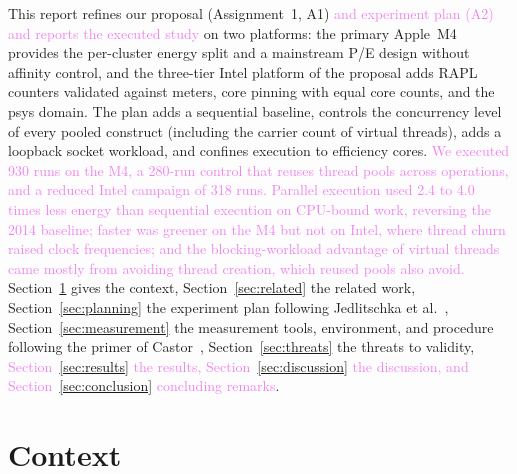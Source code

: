 \documentclass[sigconf,nonacm]{acmart}
\newcommand{\upd}[1]{\textcolor{violet}{#1}}
\begin{document}
This report refines our proposal (Assignment~1, A1) \upd{and experiment plan (A2) and reports the executed study} on two platforms: the primary Apple~M4 provides the per-cluster energy split and a mainstream P/E design without affinity control, and the three-tier Intel platform of the proposal adds RAPL counters validated against meters, core pinning with equal core counts, and the psys domain. The plan adds a sequential baseline, controls the concurrency level of every pooled construct (including the carrier count of virtual threads), adds a loopback socket workload, and confines execution to efficiency cores. \upd{We executed 930 runs on the M4, a 280-run control that reuses thread pools across operations, and a reduced Intel campaign of 318 runs. Parallel execution used 2.4 to 4.0 times less energy than sequential execution on CPU-bound work, reversing the 2014 baseline; faster was greener on the M4 but not on Intel, where thread churn raised clock frequencies; and the blocking-workload advantage of virtual threads came mostly from avoiding thread creation, which reused pools also avoid.} Section~\ref{sec:context} gives the context, Section~\ref{sec:related} the related work, Section~\ref{sec:planning} the experiment plan following Jedlitschka et al.~\cite{jedlitschka2008reporting}, Section~\ref{sec:measurement} the measurement tools, environment, and procedure following the primer of Castor~\cite{castor2024primer}, Section~\ref{sec:threats} the threats to validity, \upd{Section~\ref{sec:results} the results, Section~\ref{sec:discussion} the discussion, and Section~\ref{sec:conclusion} concluding remarks}.

\section{Context}\label{sec:context}
\end{document}

